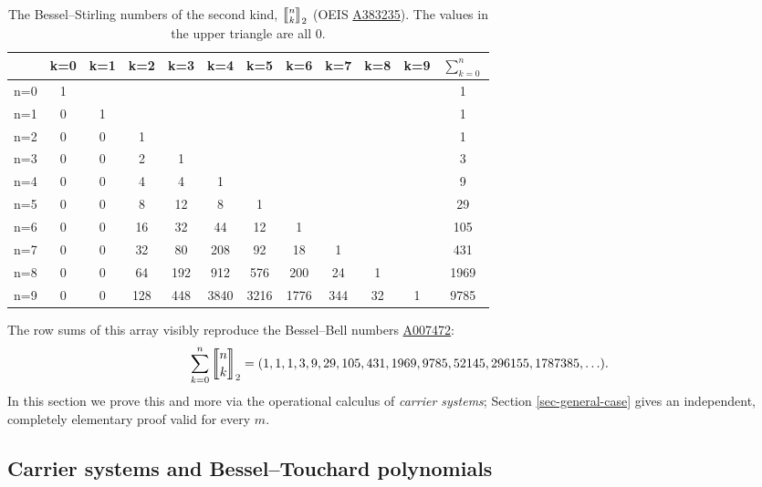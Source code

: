 \documentclass[a4paper]{amsart}
\numberwithin{equation}{section}
\newcommand{\mStirling}[0]{\genfrac{\llbracket}{\rrbracket}{0pt}{}}
\begin{document}
\begin{table}[htbp]
    \centering
        \begin{tabular}{|l|*{10}{c}|c|}
        \hline
              & k=0 & k=1 & k=2 & k=3 & k=4 & k=5 & k=6 & k=7 & k=8 & k=9 & $\sum_{k=0}^{n}$ \\
        \hline
        n=0 & 1   &     &     &     &     &     &     &     &     &     & 1                \\
        n=1 & 0   & 1   &     &     &     &     &     &     &     &     & 1                \\
        n=2 & 0   & 0   & 1   &     &     &     &     &     &     &     & 1                \\
        n=3 & 0   & 0   & 2   & 1   &     &     &     &     &     &     & 3                \\
        n=4 & 0   & 0   & 4   & 4   & 1   &     &     &     &     &     & 9                \\
        n=5 & 0   & 0   & 8   & 12  & 8   & 1   &     &     &     &     & 29               \\
        n=6 & 0   & 0   & 16  & 32  & 44  & 12  & 1   &     &     &     & 105              \\
        n=7 & 0   & 0   & 32  & 80  & 208 & 92  & 18  & 1   &     &     & 431              \\
        n=8 & 0   & 0   & 64  & 192 & 912 & 576 & 200 & 24  & 1   &     & 1969             \\
        n=9 & 0   & 0   & 128 & 448 & 3840& 3216& 1776& 344 & 32  & 1   & 9785             \\
        \hline
        \end{tabular}
        \bigskip
    \caption{The Bessel--Stirling numbers of the second kind, $\mStirling{n}{k}_2$ (OEIS \href{https://oeis.org/A383235}{A383235}). The values in the upper triangle are all 0.}
    \label{tab-bessel-stirling2}
\end{table}

The row sums of this array visibly reproduce the Bessel--Bell numbers \href{https://oeis.org/A007472}{A007472}:
\[
\sum_{k=0}^{n} \mStirling{n}{k}_2 = (1, 1, 1, 3, 9, 29, 105, 431, 1969, 9785, 52145, 296155, 1787385, \ldots).
\]
In this section we prove this and more via the operational calculus of \emph{carrier systems}; Section \ref{sec-general-case} gives an independent, completely elementary proof valid for every $m$.

\subsection{Carrier systems and Bessel--Touchard polynomials}
\end{document}
